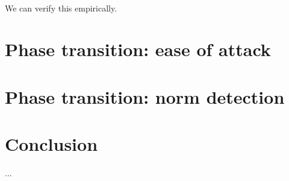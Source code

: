 \documentclass[]{scrarticle}
\begin{document}
\paragraph{} We can verify this empirically.


\section{Phase transition: ease of attack}

\section{Phase transition: norm detection}


\section*{Conclusion}

...

\newpage
\nocite{*}


\end{document}

